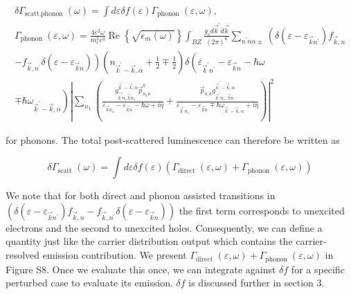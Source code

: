 \documentclass[10pt]{article}
\begin{document}
$$
\begin{gathered}
\delta \Gamma_{\text {scatt,phonon }}(\omega)=\int d \varepsilon \delta f(\varepsilon) \Gamma_{\text {phonon }}(\varepsilon, \omega), \\
\Gamma_{\text {phonon }}(\varepsilon, \omega)=\frac{4 e^{2} \omega}{m_{e}^{2} c^{3}} \operatorname{Re}\left\{\sqrt{\epsilon_{m}(\omega)}\right\} \int_{B Z} \frac{g_{s} d \vec{k}^{\prime} d \vec{k}}{(2 \pi)^{6}} \sum_{n^{\prime} n \alpha \pm}\left(\delta\left(\varepsilon-\varepsilon_{\vec{k} n^{\prime}}\right) f_{\vec{k}, n}\right. \\
\left.-f_{\vec{k}, n^{\prime}} \delta\left(\varepsilon-\varepsilon_{\vec{k} n}\right)\right)\left(n_{\vec{k}^{\prime}-\vec{k}, \alpha}+\frac{1}{2} \mp \frac{1}{2}\right) \delta\left(\varepsilon_{\vec{k}^{\prime} n^{\prime}}-\varepsilon_{\vec{k} n}-\hbar \omega\right. \\
\left.\mp \hbar \omega_{\vec{k}^{\prime}-\vec{k}, \alpha}\right)\left|\sum_{n_{1}}\left(\frac{g_{\overrightarrow{k^{\prime}} n, \vec{k} n_{1}}^{\vec{k}^{\prime}-\vec{k}, \alpha} \vec{p}_{n_{1} n}^{k}}{\varepsilon_{\vec{k} n_{1}}-\varepsilon_{\vec{k} n}-\hbar \omega+i \eta}+\frac{\vec{p}_{n^{\prime} n} g_{\vec{k}^{\prime} n_{1}, \vec{k} n}^{\vec{k}^{\prime}-\vec{k}, \alpha}}{\varepsilon_{\vec{k}^{\prime} n_{1}}-\varepsilon_{\vec{k} n} \mp \hbar \omega_{\vec{k}^{\prime}-\vec{k}, \alpha}+i \eta}\right)\right|^{2}
\end{gathered}
$$

for phonons. The total post-scattered luminescence can therefore be written as

$$
\delta \Gamma_{\text {scatt }}(\omega)=\int d \varepsilon \delta f(\varepsilon)\left(\Gamma_{\text {direct }}(\varepsilon, \omega)+\Gamma_{\text {phonon }}(\varepsilon, \omega)\right)
$$

We note that for both direct and phonon assisted transitions in $\left(\delta\left(\varepsilon-\varepsilon_{\vec{k} n^{\prime}}\right) f_{\vec{k}, n}-f_{\vec{k}, n^{\prime}} \delta\left(\varepsilon-\varepsilon_{\vec{k} n}\right)\right)$ the first term corresponds to unexcited electrons and the second to unexcited holes. Consequently, we can define a quantity just like the carrier distribution output which contains the carrier-resolved emission contribution. We present $\Gamma_{\text {direct }}(\varepsilon, \omega)+\Gamma_{\text {phonon }}(\varepsilon, \omega)$ in Figure S8. Once we evaluate this once, we can integrate against $\delta f$ for a specific perturbed case to evaluate its emission. $\delta f$ is discussed further in section 3.
\end{document}
